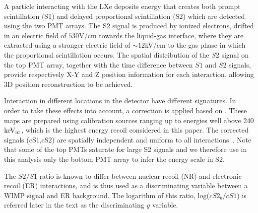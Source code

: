 A particle interacting with the LXe deposits energy that creates both
prompt scintillation (S1) and delayed proportional scintillation (S2) which are detected using the two PMT arrays. The S2 signal is produced by ionized electrons, drifted in an electric field of $530$V/cm towards the liquid-gas interface, where they are extracted using a stronger electric field of $\sim12$kV/cm to the gas phase in which the proportional scintillation occurs. 
The spatial distribution of the $S2$ signal on the top PMT array, together with the time difference between $S1$ and $S2$ signals, provide respectively X-Y and Z position information for each interaction, allowing 3D position reconstruction to be achieved.

Interaction in different locations in the detector have different signatures. In order to take these effects into account, a correction is applied based on . These maps are prepared using calibration sources ranging up to energies well above 240$\mathrm{keV_{nr}}$, which is the highest energy recoil considered in this paper. The corrected signals (cS1,cS2) are spatially independent and uniform to all interactions~\cite{xe100_instr2012}. Note that some of the top PMTs saturate for large S2 signals and we therefore use in this analysis only the bottom PMT array to infer the energy scale in S2.

The $S2/S1$ ratio is known to differ between nuclear recoil (NR) and electronic recoil (ER) interactions, and is thus used as a discriminating variable between a WIMP signal and ER background. The logarithm of this ratio, log($cS2_b/cS1$) is referred later in the text as the discriminating $y$ variable.


